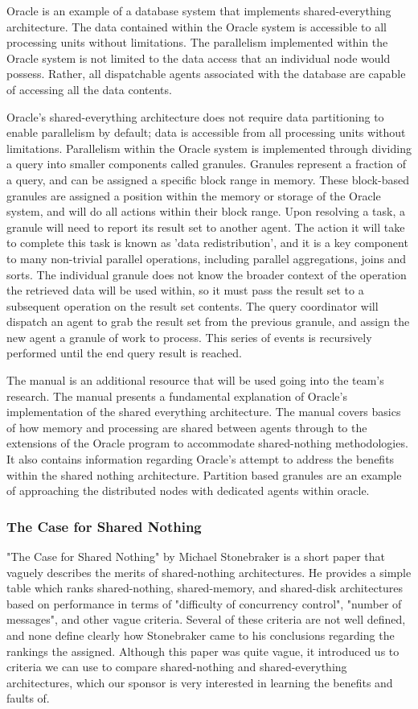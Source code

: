 \documentclass[onecolumn, draftclsnofoot,10pt, compsoc]{IEEEtran}
\begin{document}
Oracle is an example of a database system that implements shared-everything architecture.
The data contained within the Oracle system is accessible to all processing units without limitations. 
The parallelism implemented within the Oracle system is not limited to the data access that an individual node would possess.
Rather, all dispatchable agents associated with the database are capable of accessing all the data contents.

Oracle's shared-everything architecture does not require data partitioning to enable parallelism by default; data is accessible from all processing units without limitations.
Parallelism within the Oracle system is implemented through dividing a query into smaller components called granules.
Granules represent a fraction of a query, and can be assigned a specific block range in memory.
These block-based granules are assigned a position within the memory or storage of the Oracle system, and will do all actions within their block range.
Upon resolving a task, a granule will need to report its result set to another agent.
The action it will take to complete this task is known as 'data redistribution', and it is a key component to many non-trivial parallel operations, including parallel aggregations, joins and sorts. 
The individual granule does not know the broader context of the operation the retrieved data will be used within, so it must pass the result set to a subsequent operation on the result set contents.
The query coordinator will dispatch an agent to grab the result set from the previous granule, and assign the new agent a granule of work to process. 
This series of events is recursively performed until the end query result is reached.

The manual is an additional resource that will be used going into the team's research. 
The manual presents a fundamental explanation of Oracle's implementation of the shared everything architecture. 
The manual covers basics of how memory and processing are shared between agents through to the extensions of the Oracle program to accommodate shared-nothing methodologies.
It also contains information regarding Oracle's attempt to address the benefits within the shared nothing architecture.
Partition based granules are an example of approaching the distributed nodes with dedicated agents within oracle. 

\subsubsection{The Case for Shared Nothing}
"The Case for Shared Nothing" by Michael Stonebraker is a short paper that vaguely describes the merits of shared-nothing architectures.
He provides a simple table which ranks shared-nothing, shared-memory, and shared-disk architectures based on performance in terms of "difficulty of concurrency control", "number of messages", and other vague criteria.
Several of these criteria are not well defined, and none define clearly how Stonebraker came to his conclusions regarding the rankings the assigned.
Although this paper was quite vague, it introduced us to criteria we can use to compare shared-nothing and shared-everything architectures, which our sponsor is very interested in learning the benefits and faults of. 
\end{document}
